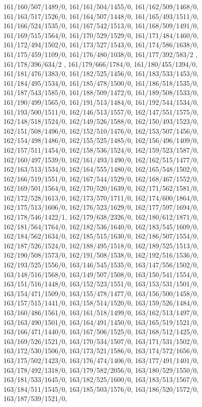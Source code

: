 {161/160/507/1489/0,%
161/161/504/1455/0,%
161/162/509/1468/0,%
161/163/517/1526/0,%
161/164/507/1448/0,%
161/165/493/1511/0,%
161/166/524/1535/0,%
161/167/542/1513/0,%
161/168/509/1491/0,%
161/169/515/1564/0,%
161/170/529/1529/0,%
161/171/484/1460/0,%
161/172/494/1502/0,%
161/173/527/1543/0,%
161/174/586/1638/0,%
161/175/459/1109/0,%
161/176/480/1038/0,%
161/177/392/583/2 ,%
161/178/396/634/2 ,%
161/179/666/1784/0,%
161/180/455/1394/0,%
161/181/476/1383/0,%
161/182/525/1456/0,%
161/183/533/1453/0,%
161/184/495/1534/0,%
161/185/478/1500/0,%
161/186/518/1535/0,%
161/187/543/1585/0,%
161/188/509/1472/0,%
161/189/508/1533/0,%
161/190/499/1565/0,%
161/191/513/1484/0,%
161/192/544/1534/0,%
161/193/500/1511/0,%
162/146/513/1557/0,%
162/147/551/1575/0,%
162/148/518/1524/0,%
162/149/526/1588/0,%
162/150/493/1523/0,%
162/151/508/1496/0,%
162/152/510/1476/0,%
162/153/507/1456/0,%
162/154/498/1486/0,%
162/155/525/1485/0,%
162/156/496/1409/0,%
162/157/511/1454/0,%
162/158/536/1524/0,%
162/159/523/1587/0,%
162/160/497/1539/0,%
162/161/493/1490/0,%
162/162/515/1477/0,%
162/163/513/1534/0,%
162/164/555/1480/0,%
162/165/548/1502/0,%
162/166/519/1551/0,%
162/167/544/1529/0,%
162/168/467/1552/0,%
162/169/501/1564/0,%
162/170/520/1639/0,%
162/171/562/1581/0,%
162/172/528/1613/0,%
162/173/570/1711/0,%
162/174/600/1864/0,%
162/175/513/1606/0,%
162/176/523/1629/0,%
162/177/597/1694/0,%
162/178/546/1422/1,%
162/179/638/2326/0,%
162/180/612/1871/0,%
162/181/564/1764/0,%
162/182/536/1640/0,%
162/183/545/1609/0,%
162/184/562/1634/0,%
162/185/515/1630/0,%
162/186/507/1554/0,%
162/187/526/1524/0,%
162/188/495/1518/0,%
162/189/525/1513/0,%
162/190/508/1573/0,%
162/191/508/1538/0,%
162/192/516/1536/0,%
162/193/525/1556/0,%
163/146/545/1535/0,%
163/147/556/1502/0,%
163/148/516/1568/0,%
163/149/507/1508/0,%
163/150/541/1554/0,%
163/151/516/1448/0,%
163/152/523/1551/0,%
163/153/531/1501/0,%
163/154/471/1509/0,%
163/155/478/1477/0,%
163/156/500/1458/0,%
163/157/515/1441/0,%
163/158/514/1520/0,%
163/159/526/1484/0,%
163/160/486/1561/0,%
163/161/518/1499/0,%
163/162/513/1497/0,%
163/163/490/1501/0,%
163/164/491/1450/0,%
163/165/519/1521/0,%
163/166/471/1440/0,%
163/167/506/1525/0,%
163/168/512/1425/0,%
163/169/526/1521/0,%
163/170/534/1507/0,%
163/171/531/1502/0,%
163/172/530/1506/0,%
163/173/521/1586/0,%
163/174/572/1656/0,%
163/175/502/1423/0,%
163/176/474/1406/0,%
163/177/491/1401/0,%
163/178/492/1318/0,%
163/179/582/2056/0,%
163/180/529/1550/0,%
163/181/533/1645/0,%
163/182/525/1600/0,%
163/183/513/1567/0,%
163/184/511/1545/0,%
163/185/503/1576/0,%
163/186/520/1572/0,%
163/187/539/1521/0,%
}

